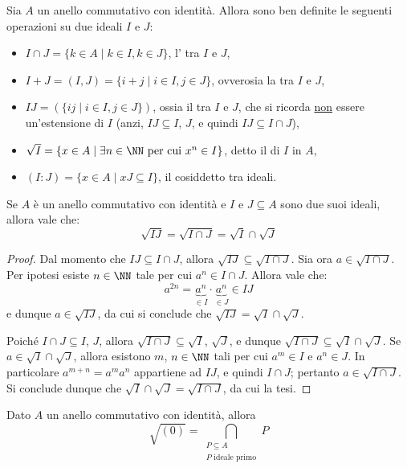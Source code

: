 \documentclass[11pt]{scrartcl}
\begin{document}
	Sia $A$ un anello commutativo con identità. Allora sono ben definite le
	seguenti operazioni su due ideali $I$ e $J$:
	\begin{itemize}
		\item $I\cap J = \{k \in A \mid k \in I, k \in J\}$, l' tra
		$I$ e $J$,
		\item $I + J = (I, J) = \{i + j \mid i \in I, j \in J\}$, ovverosia la  tra $I$ e $J$,
		\item $IJ = (\{ij\mid i \in I, j \in J\})$, ossia il  tra $I$ e $J$, che si ricorda \underline{non} essere
		un'estensione di $I$ (anzi, $IJ \subseteq I$, $J$, e quindi $IJ \subseteq I \cap J$),
		\item $\sqrt{I} = \{x \in A \mid \exists n \in \NN \text{ per cui } x^n \in I\}$,
		detto il  di $I$ in $A$,
		\item $(I : J) = \{x \in A \mid xJ \subseteq I\}$, il cosiddetto  tra ideali.
	\end{itemize}
	
	\begin{proposition}
		Se $A$ è un anello commutativo con identità e $I$ e $J \subseteq A$ sono due suoi ideali,
		allora vale che:
		\[
		\sqrt{IJ} = \sqrt{I\cap J} = \sqrt{I}\cap \sqrt{J}
		\]
	\end{proposition}
	
	\begin{proof}
		Dal momento che $IJ \subseteq I \cap J$, allora $\sqrt{IJ} \subseteq \sqrt{I \cap J}$. Sia ora $a \in \sqrt{I \cap J}$. Per ipotesi esiste $n \in \NN$ tale
		per cui $a^n \in I \cap J$. Allora vale che:
		\[
		a^{2n} = \underbrace{a^n}_{\in I} \cdot \underbrace{a^n}_{\in J}
		\in IJ
		\]
		e dunque $a \in \sqrt{IJ}$, da cui si conclude che $\sqrt{IJ} = \sqrt{I} \cap \sqrt{J}$. \medskip
		
		
		Poiché $I \cap J \subseteq I$, $J$, allora $\sqrt{I \cap J} \subseteq \sqrt{I}$,
		$\sqrt{J}$, e dunque $\sqrt{I \cap J} \subseteq \sqrt{I} \cap \sqrt{J}$. Se
		$a \in \sqrt{I} \cap \sqrt{J}$, allora esistono $m$, $n \in \NN$ tali per
		cui $a^m \in I$ e $a^n \in J$. In particolare $a^{m+n} = a^m a^n$ appartiene
		ad $IJ$, e quindi $I \cap J$; pertanto $a \in \sqrt{I \cap J}$. Si conclude
		dunque che $\sqrt{I} \cap \sqrt{J} = \sqrt{I \cap J}$, da cui la tesi.
	\end{proof}
	
	\begin{proposition}
		\label{prop2.9}
		Dato $A$ un anello commutativo con identità, allora
		\[
		\sqrt{(0)} = \bigcap_{\substack{P\subseteq A\\ P \text{ ideale primo}}}P
		\]
	\end{proposition}
	
\end{document}
